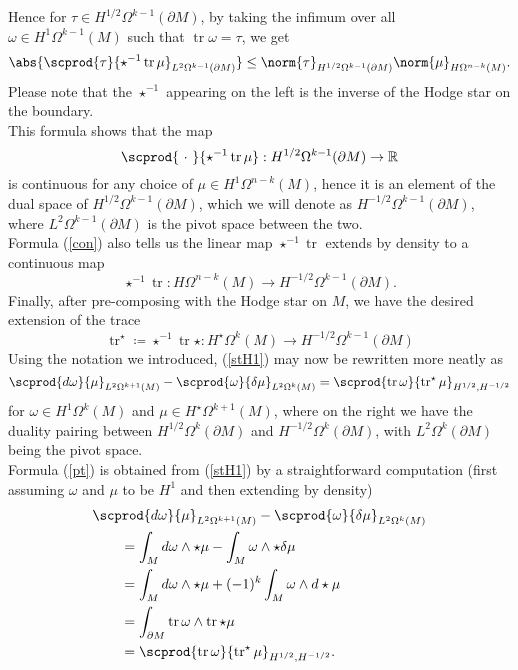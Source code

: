 \documentclass{ifacconf}
\newcommand{\R}{\mathbb{R}}
\newcommand{\tr}{\operatorname{tr}}
\newcommand{\drh}[2]{\Omega^{#2}(#1)}
\begin{document}
Hence for $\tau\in H^{1/2}\drh{\partial M}{k-1}$, by taking the infimum over all $\omega\in H^1\drh{M}{k-1}$ such that $\tr\omega=\tau$, we get
\begin{equation}\label{con}
    \abs{\scprod{\tau}{\star^{-1}\tr\mu}_{L^2\drh{\partial M}{k-1}}}\leq \norm{\tau}_{H^{1/2}\drh{\partial M}{k-1}}\norm{\mu}_{H\drh{M}{n-k}}.
\end{equation}
Please note that the $\star^{-1}$ appearing on the left is the inverse of the Hodge star on the boundary.\\
This formula shows that the map
\[
    \scprod{\ \cdot\ }{\star^{-1}\tr\mu}:H^{1/2}\drh{\partial M}{k-1}\to \R
\]
is continuous for any choice of $\mu\in H^1\drh{M}{n-k}$, hence it is an element of the dual space of $H^{1/2}\drh{\partial M}{k-1}$, which we will denote as $H^{-1/2}\drh{\partial M}{k-1}$, where $L^2\drh{\partial M}{k-1}$ is the pivot space between the two.\\
Formula (\ref{con}) also tells us the linear map $\star^{-1}\tr$ extends by density to a continuous map
\[
    \star^{-1}\tr\colon H\drh{M}{n-k}\to H^{-1/2}\drh{\partial M}{k-1}.
\]
Finally, after pre-composing with the Hodge star on $M$, we have the desired extension of the trace
\begin{equation}\label{star}
    \tr^{\star}\coloneqq\star^{-1}\tr\star\colon H^{\star}\drh{M}{k}\to H^{-1/2}\drh{\partial M}{k-1}
\end{equation}
Using the notation we introduced, (\ref{stH1}) may now be rewritten more neatly as
\begin{equation}\label{pt}
    \scprod{d\omega}{\mu}_{L^2\drh{M}{k+1}}-\scprod{\omega}{\delta\mu}_{L^2\drh{M}{k}}=\scprod{\tr\omega}{\tr^{\star}\mu}_{H^{1/2},H^{-1/2}}
\end{equation}
for $\omega\in H^1\drh{M}{k}$ and $\mu\in H^{\star}\drh{M}{k+1}$, where on the right we have the duality pairing between $H^{1/2}\drh{\partial M}{k}$ and $H^{-1/2}\drh{\partial M}{k}$, with $L^2\drh{\partial M}{k}$ being the pivot space.\\
Formula (\ref{pt}) is obtained from (\ref{stH1}) by a straightforward computation (first assuming $\omega$ and $\mu$ to be $H^1$ and then extending by density)
\begin{align*}
    \MoveEqLeft
    \scprod{d\omega}{\mu}_{L^2\drh{M}{k+1}}-\scprod{\omega}{\delta\mu}_{L^2\drh{M}{k}}\\
    &=\int_M d\omega\wedge\star\mu -\int_M \omega\wedge \star\delta\mu \\
    &=\int_M d\omega\wedge \star\mu +(-1)^k\int_M\omega\wedge d\star\mu  \\
    &=\int_{\partial M} \tr\omega\wedge\tr\star\mu \\
    &=\scprod{\tr\omega}{\tr^{\star}\mu}_{H^{1/2},H^{-1/2}}.
\end{align*}
\end{document}
